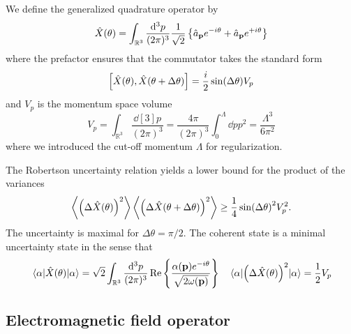 We define the generalized quadrature operator by 
\begin{equation}
	\hat{X}(\theta)
	=
	\int_{\mathbb{R}^3}
	\frac{\dd[3]{p}}{(2\pi)^3}
	\frac{1}{\sqrt{2}}
	\left\{
		\hat{a}_{\vb{p}}
		e^{-i\theta}
		+
		\hat{a}_{\vb{p}}
		e^{+i\theta}
	\right\}
\end{equation}
where the prefactor ensures that the commutator takes the standard form
\begin{equation}
	\comm{\hat{X}(\theta)}{\hat{X}(\theta+\Delta\theta)}
	=
	\frac{i}{2}
	\sin(\Delta\theta)
	V_p
\end{equation}
and $V_p$ is the momentum space volume
\begin{equation}
	V_p
	=
	\int_{\mathbb{R}^3}\frac{\dd[3]{p}}{(2\pi)^3}
	=
	\frac{4\pi}{(2\pi)^3}
	\int_0^\Lambda\dd{p}p^2
	=
	\frac{\Lambda^3}{6\pi^2}
\end{equation}
where we introduced the cut-off momentum $\Lambda$ for regularization.

The Robertson uncertainty relation yields a lower bound for the product of the variances
\begin{equation}
	\expval{\left(\Delta\hat{X}(\theta)\right)^2}
	\expval{\left(\Delta\hat{X}(\theta+\Delta\theta)\right)^2}
	\geq
	\frac{1}{4}
	\sin(\Delta\theta)^2
	V_p^2
	.
\end{equation}
The uncertainty is maximal for $\Delta\theta=\pi/2$.
The coherent state is a minimal uncertainty state in the sense that
\begin{align}
	\expval{\hat{X}(\theta)}{\alpha}
	=
	\sqrt{2}
	\int_{\mathbb{R}^3}
	\frac{\dd[3]{p}}{(2\pi)^3}
	\operatorname{\operatorname{Re}}\left\{
		\frac{\alpha(\vb{p})e^{-i\theta}}{\sqrt{2\omega(\vb{p})}}
	\right\}
	&&
	\expval{\left(\Delta\hat{X}(\theta)\right)^2}{\alpha}
	=
	\frac{1}{2}
	V_p
\end{align}

\subsection{Electromagnetic field operator}